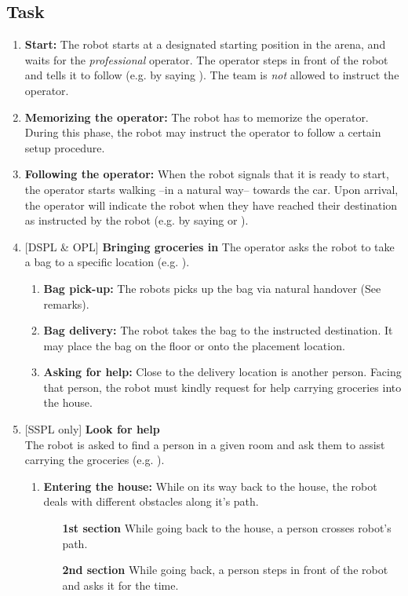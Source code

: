 \subsection{Task}
\begin{enumerate}
  \item \textbf{Start:} The robot starts at a designated starting position in the arena, and waits for the \textit{professional} operator. The operator steps in front of the robot and tells it to follow (e.g. by saying ). The team is \emph{not} allowed to instruct the operator.

  \item \textbf{Memorizing the operator:} The robot has to memorize the operator. During this phase, the robot may instruct the operator to follow a certain setup procedure.

  \item \textbf{Following the operator:} When the robot signals that it is ready to start, the operator starts walking --in a natural way-- towards the car. Upon arrival, the operator will indicate the robot when they have reached their destination as instructed by the robot (e.g. by saying  or ).

  \setcounter{enumTemp}{\theenumi}
  \item {[DSPL \& OPL]} \textbf{Bringing groceries in}
  The operator asks the robot to take a bag to a specific location (e.g. ).
  \begin{enumerate}
    \item \textbf{Bag pick-up:} The robots picks up the bag via natural handover (See remarks).
    \item \textbf{Bag delivery:} The robot takes the bag to the instructed destination. It may place the bag on the floor or onto the placement location.
    \item \textbf{Asking for help:} Close to the delivery location is another person. Facing that person, the robot must kindly request for help carrying groceries into the house.
  \end{enumerate}

  \setcounter{enumi}{\theenumTemp}
  \item {[SSPL only]} \textbf{Look for help} \\
  The robot is asked to find a person in a given room and ask them to assist carrying the groceries (e.g. ).
  \begin{enumerate}
    \item \textbf{Entering the house:} While on its way back to the house, the robot deals with different obstacles along it's path.
    \begin{itemize}[leftmargin=3cm]
      \item[\textbf{1st section}] While going back to the house, a person crosses robot's path.
      \item[\textbf{2nd section}] While going back, a person steps in front of the robot and asks it for the time.
    \end{itemize}


\end{enumerate}
\end{enumerate}
